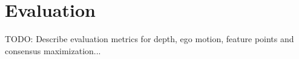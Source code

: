 \section{Evaluation}

TODO: Describe evaluation metrics for depth, ego motion, feature points and consensus maximization...
